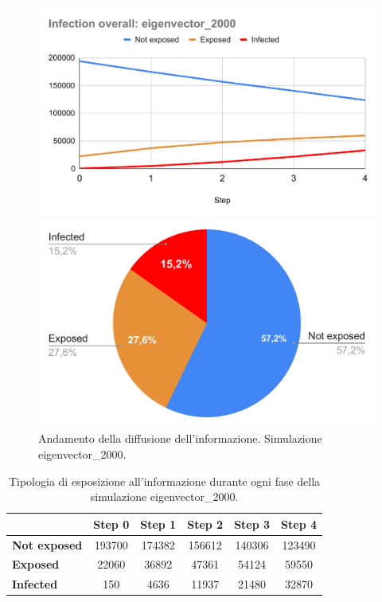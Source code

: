             \begin{figure}[H]
                \centering
                \begin{minipage}[c]{0.55\textwidth}
                    \includegraphics[width=\textwidth]{resources/charts/Infection overall_ eigenvector_2000.pdf}
                \end{minipage}
                \hfill
                \begin{minipage}[c]{0.44\textwidth}
                    \includegraphics[width=\textwidth]{resources/charts/pie_eig_2000.pdf}
                \end{minipage}
                \caption{Andamento della diffusione dell'informazione. Simulazione eigenvector\_2000.}
            \end{figure}
        
        \begin{table}[H]
            \centering
            \begin{tabular}{l|c|c|c|c|c}
                        & Step 0 & Step 1 & Step 2 & Step 3 & Step 4 \\ \hline
            \textbf{Not exposed} & 193700 & 174382 & 156612 & 140306 & 123490 \\ \hline
            \textbf{Exposed}     & 22060  & 36892  & 47361  & 54124  & 59550  \\ \hline
            \textbf{Infected}    & 150    & 4636   & 11937  & 21480  & 32870  \\
            \end{tabular}
            \caption{Tipologia di esposizione all'informazione durante ogni fase della simulazione eigenvector\_2000.}
        \end{table}
        
